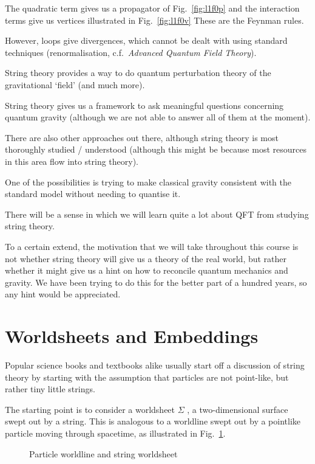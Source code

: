 The quadratic term gives us a propagator of Fig.~\ref{fig:l1f0p}
and the interaction terms give us vertices illustrated in Fig.~\ref{fig:l1f0v}
These are the Feynman rules.

However, loops give divergences, which cannot be dealt with using standard techniques (renormalisation, c.f.~\emph{Advanced Quantum Field Theory}).

String theory provides a way to do quantum perturbation theory of the gravitational `field' (and much more).

String theory gives us a framework to ask meaningful questions concerning quantum gravity (although we are not able to answer all of them at the moment).

There are also other approaches out there, although string theory is most thoroughly studied / understood (although this might be because most resources in this area flow into string theory).

One of the possibilities is trying to make classical gravity consistent with the standard model without needing to quantise it.

There will be a sense in which we will learn quite a lot about QFT from studying string theory.

To a certain extend, the motivation that we will take throughout this course is not whether string theory will give us a theory of the real world, but rather whether it might give us a hint on how to reconcile quantum mechanics and gravity. We have been trying to do this for the better part of a hundred years, so any hint would be appreciated.

\section{Worldsheets and Embeddings}%
\label{sec:worldsheets_and_embeddings}

Popular science books and textbooks alike usually start off a discussion of string theory by starting with the assumption that particles are not point-like, but rather tiny little strings.

The starting point is to consider a worldsheet $\Sigma$ , a two-dimensional surface swept out by a string. This is analogous to a worldline swept out by a pointlike particle moving through spacetime, as illustrated in Fig.~\ref{fig:l1f1}.
\begin{figure}[tbhp]
  \centering
  \def\svgwidth{0.4\columnwidth}
  
  \caption{Particle worldline and string worldsheet}
  \label{fig:l1f1}
\end{figure}

